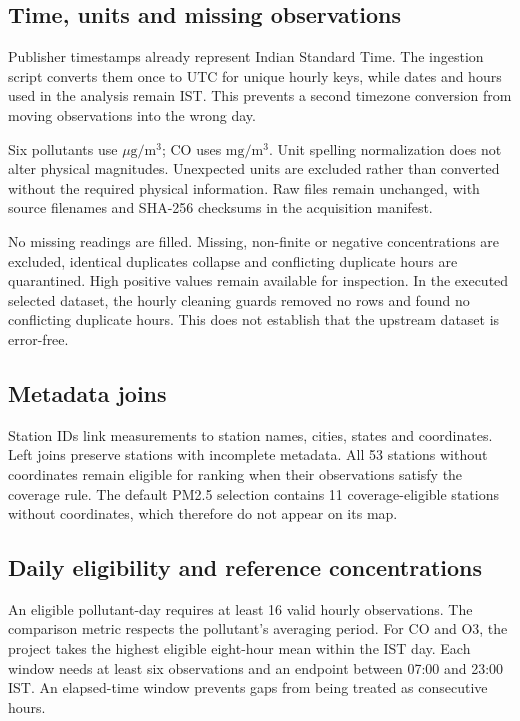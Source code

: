 \documentclass[11pt,a4paper]{article}
\newcommand{\units}{\ensuremath{\mu\mathrm{g}/\mathrm{m}^{3}}}
\begin{document}
\subsection{Time, units and missing observations}
Publisher timestamps already represent Indian Standard Time. The ingestion script converts them once to UTC for unique hourly keys, while dates and hours used in the analysis remain IST. This prevents a second timezone conversion from moving observations into the wrong day.

Six pollutants use \units; CO uses $\mathrm{mg}/\mathrm{m}^{3}$. Unit spelling normalization does not alter physical magnitudes. Unexpected units are excluded rather than converted without the required physical information. Raw files remain unchanged, with source filenames and SHA-256 checksums in the acquisition manifest.

No missing readings are filled. Missing, non-finite or negative concentrations are excluded, identical duplicates collapse and conflicting duplicate hours are quarantined. High positive values remain available for inspection. In the executed selected dataset, the hourly cleaning guards removed no rows and found no conflicting duplicate hours. This does not establish that the upstream dataset is error-free.

\subsection{Metadata joins}
Station IDs link measurements to station names, cities, states and coordinates. Left joins preserve stations with incomplete metadata. All 53 stations without coordinates remain eligible for ranking when their observations satisfy the coverage rule. The default PM2.5 selection contains 11 coverage-eligible stations without coordinates, which therefore do not appear on its map.

\newpage
\subsection{Daily eligibility and reference concentrations}
An eligible pollutant-day requires at least 16 valid hourly observations. The comparison metric respects the pollutant's averaging period. For CO and O3, the project takes the highest eligible eight-hour mean within the IST day. Each window needs at least six observations and an endpoint between 07:00 and 23:00 IST. An elapsed-time window prevents gaps from being treated as consecutive hours.
\end{document}
